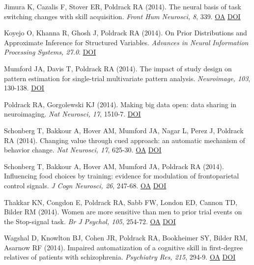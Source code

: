 \documentclass[10pt, letterpaper]{article}
\begin{document}
Jimura K, Cazalis F, Stover ER, Poldrack RA (2014). The neural basis of task switching changes with skill acquisition. \textit{Front Hum Neurosci, 8}, 339. \href{https://www.ncbi.nlm.nih.gov/pmc/articles/PMC4033195}{OA} \href{http://dx.doi.org/10.3389/fnhum.2014.00339}{DOI} \vspace{2mm}

Koyejo O, Khanna R, Ghosh J, Poldrack RA (2014). On Prior Distributions and Approximate Inference for Structured Variables. \textit{Advances in Neural Information Processing Systems, 27.0}. \href{http://dx.doi.org/None}{DOI} \vspace{2mm}

Mumford JA, Davis T, Poldrack RA (2014). The impact of study design on pattern estimation for single-trial multivariate pattern analysis. \textit{Neuroimage, 103}, 130-138. \href{http://dx.doi.org/10.1016/j.neuroimage.2014.09.026}{DOI} \vspace{2mm}

Poldrack RA, Gorgolewski KJ (2014). Making big data open: data sharing in neuroimaging. \textit{Nat Neurosci, 17}, 1510-7. \href{http://dx.doi.org/10.1038/nn.3818}{DOI} \vspace{2mm}

Schonberg T, Bakkour A, Hover AM, Mumford JA, Nagar L, Perez J, Poldrack RA (2014). Changing value through cued approach: an automatic mechanism of behavior change. \textit{Nat Neurosci, 17}, 625-30. \href{https://www.ncbi.nlm.nih.gov/pmc/articles/PMC4041518}{OA} \href{http://dx.doi.org/10.1038/nn.3673}{DOI} \vspace{2mm}

Schonberg T, Bakkour A, Hover AM, Mumford JA, Poldrack RA (2014). Influencing food choices by training: evidence for modulation of frontoparietal control signals. \textit{J Cogn Neurosci, 26}, 247-68. \href{https://www.ncbi.nlm.nih.gov/pmc/articles/PMC4066661}{OA} \href{http://dx.doi.org/10.1162/jocn_a_00495}{DOI} \vspace{2mm}

Thakkar KN, Congdon E, Poldrack RA, Sabb FW, London ED, Cannon TD, Bilder RM (2014). Women are more sensitive than men to prior trial events on the Stop-signal task. \textit{Br J Psychol, 105}, 254-72. \href{https://www.ncbi.nlm.nih.gov/pmc/articles/PMC4000536}{OA} \href{http://dx.doi.org/10.1111/bjop.12034}{DOI} \vspace{2mm}

Wagshal D, Knowlton BJ, Cohen JR, Poldrack RA, Bookheimer SY, Bilder RM, Asarnow RF (2014). Impaired automatization of a cognitive skill in first-degree relatives of patients with schizophrenia. \textit{Psychiatry Res, 215}, 294-9. \href{https://www.ncbi.nlm.nih.gov/pmc/articles/PMC4191851}{OA} \href{http://dx.doi.org/10.1016/j.psychres.2013.11.024}{DOI} \vspace{2mm}
\end{document}
